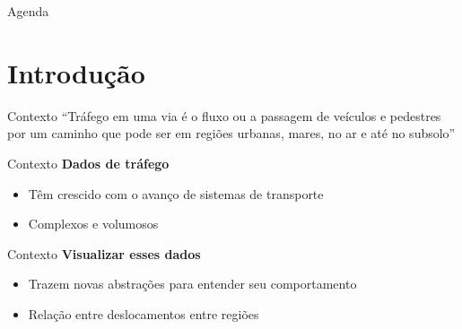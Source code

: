 



\customtitlepage

\showqrcode

\begin{frame}{Agenda}
  \overview
\end{frame}

\section{Introdução}

\begin{frame}{Contexto}
  ``Tráfego em uma via é o fluxo ou a passagem de veículos e pedestres por um
caminho que pode ser em regiões urbanas, mares, no ar e até no subsolo''

\hfill \citep{Chen2015}
\end{frame}

\begin{frame}{Contexto}
  \textbf{Dados de tráfego}
  \begin{itemize}
    \item Têm crescido com o avanço de sistemas de transporte
    \item Complexos e volumosos 
  \end{itemize}
\end{frame}

\begin{frame}{Contexto}
  \textbf{Visualizar esses dados}
  \begin{itemize}
    \item Trazem novas abstrações para entender seu comportamento
    \item Relação entre deslocamentos entre regiões
  \end{itemize}
\end{frame}

